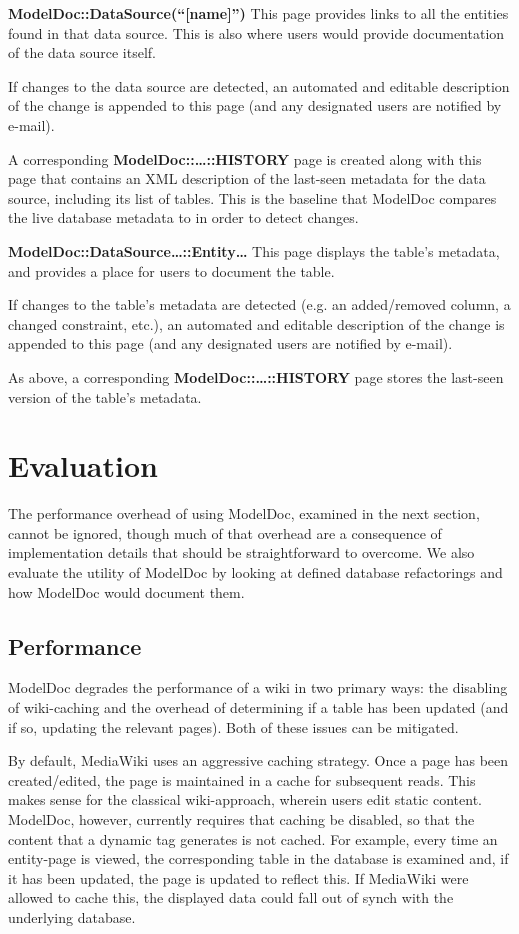 \documentclass[nocopyrightspace]{acm_proc_article-sp}
\begin{document}
\textbf{ModelDoc::DataSource(``[name]'')}
This page provides links to all the entities found in that data source.  This
is also where users would provide documentation of the data source itself.

If changes to the data source are detected, an automated and editable
description of the change is appended to this page (and any designated users
are notified by e-mail).

A corresponding \textbf{ModelDoc::\ldots::HISTORY} page is
created along with this page that contains an XML description of the last-seen
metadata for the data source, including its list of tables.  This is the
baseline that ModelDoc compares the live database metadata to in order to 
detect changes.

\textbf{ModelDoc::DataSource\ldots::Entity\ldots}
This page displays the table's metadata, and provides a place for users to
document the table.

If changes to the table's metadata are detected (e.g. an added/removed column,
a changed constraint, etc.), an automated and editable description of the
change is appended to this page (and any designated users are notified
by e-mail).

As above, a corresponding
\textbf{ModelDoc::\ldots::HISTORY}
page stores the last-seen version of the table's metadata.

\section{Evaluation}

The performance overhead of using ModelDoc, examined in the next section, cannot
be ignored, though much of that overhead are a consequence of implementation
details that should be straightforward to overcome.  We also evaluate the
utility of ModelDoc by looking at defined database refactorings and how
ModelDoc would document them.

\subsection{Performance}

ModelDoc degrades the performance of a wiki in two primary ways: the disabling
of wiki-caching and the overhead of determining if a table has been updated
(and if so, updating the relevant pages). Both of these issues can be mitigated.

By default, MediaWiki uses an aggressive caching strategy.  Once a page has
been created/edited, the page is maintained in a cache for subsequent reads. 
This makes sense for the classical wiki-approach, wherein users edit static
content.  ModelDoc, however, currently requires that caching be disabled, so
that the content that a dynamic tag generates is not cached.  For example,
every time an entity-page is viewed, the corresponding table in the database is
examined and, if it has been updated, the page is updated to reflect this.  If
MediaWiki were allowed to cache this, the displayed data could fall out of
synch with the underlying database.
\end{document}
